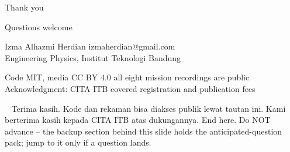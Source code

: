 \documentclass[aspectratio=169,11pt,t]{beamer}
\begin{document}
{
\begin{frame}[plain]
  \vskip8mm
  {\color{epicwhite}\headfont\fontsize{30}{34}\selectfont Thank you\par}
  \vskip18mm
  {\color{epicrust}\headfont\normalsize Questions welcome\par}
  \vskip3mm
  {\color{epicbody}\small
   Izma Alhazmi Herdian \textperiodcentered{} izmaherdian@gmail.com\\
   Engineering Physics, Institut Teknologi Bandung\par}
  \vskip5mm
  {\color{epicmuted}\small
   Code MIT, media CC BY 4.0 \textperiodcentered{} all eight mission recordings
   are public\\
   Acknowledgment: CITA ITB covered registration and publication fees\par}
  \vfill
  \hbox{\playlistqr[13mm]\hskip4mm
    }
    {Terima kasih. Kode dan rekaman bisa diakses publik lewat tautan ini. Kami berterima kasih kepada CITA ITB atas dukungannya.}
    {End here. Do NOT advance -- the backup section behind this slide holds
        the anticipated-question pack; jump to it only if a question lands.}
\end{frame}}


\end{document}
